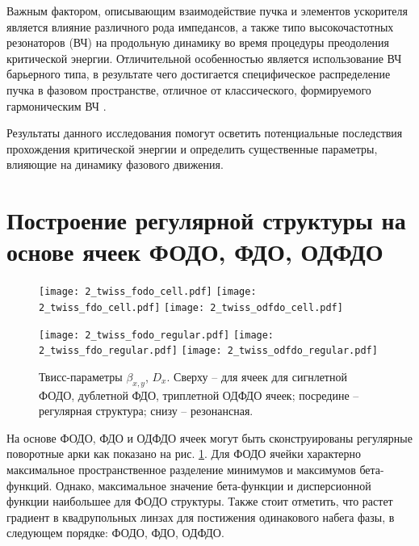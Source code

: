 \par Важным фактором, описывающим взаимодействие пучка и элементов ускорителя является влияние различного рода импедансов, а также типо высокочастотных резонаторов (ВЧ) на продольную динамику во время процедуры преодоления критической энергии. Отличительной особенностью является использование ВЧ барьерного типа, в результате чего достигается специфическое распределение пучка в фазовом пространстве, отличное от классического, формируемого гармоническим ВЧ \cite{hans:bb}.

\par Результаты данного исследования помогут осветить потенциальные последствия прохождения критической энергии и определить существенные параметры, влияющие на динамику фазового движения.

	\section{Построение регулярной структуры на основе ячеек ФОДО, ФДО, ОДФДО}\label{sec:transition_jump/FODO_FDO}



\begin{figure} [h!]

   \texttt{[image: 2\_twiss\_fodo\_cell.pdf]}
   \texttt{[image: 2\_twiss\_fdo\_cell.pdf]}
   \texttt{[image: 2\_twiss\_odfdo\_cell.pdf]}

   \texttt{[image: 2\_twiss\_fodo\_regular.pdf]}
   \texttt{[image: 2\_twiss\_fdo\_regular.pdf]}
   \texttt{[image: 2\_twiss\_odfdo\_regular.pdf]}

   \caption{Твисс-параметры $\beta_{x,y}$, $D_{x}$. Сверху -- для ячеек для сигнлетной ФОДО, дублетной ФДО, триплетной ОДФДО ячеек; посредине -- регулярная структура; снизу -- резонансная.}
   \label{fig:fodo_fdo_odfdo_regular}
\end{figure}

\par На основе ФОДО, ФДО и ОДФДО ячеек могут быть сконструированы регулярные поворотные арки как показано на рис. \ref{fig:fodo_fdo_odfdo_regular}. Для ФОДО ячейки характерно максимальное пространственное разделение минимумов и максимумов бета-функций. Однако, максимальное значение бета-функции и дисперсионной функции наибольшее для ФОДО структуры. Также стоит отметить, что растет градиент в квадрупольных линзах для постижения одинакового набега фазы, в следующем порядке: ФОДО, ФДО, ОДФДО. 

